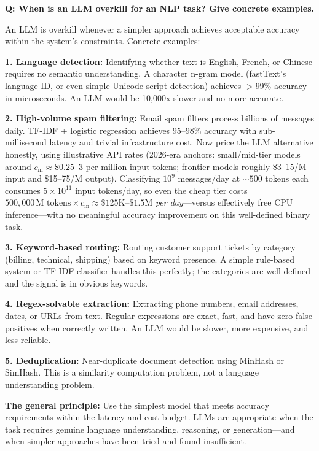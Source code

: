 \begin{interviewq}
\textbf{Q: When is an LLM overkill for an NLP task? Give concrete examples.}

 \quad {} \quad \badgefreq{\freqhigh}

\stronganswer
An LLM is overkill whenever a simpler approach achieves acceptable accuracy within the system's
constraints.  Concrete examples:

\textbf{1. Language detection:} Identifying whether text is English, French, or Chinese
requires no semantic understanding.  A character n-gram model (fastText's language ID, or
even simple Unicode script detection) achieves $>$99\% accuracy in microseconds.  An LLM
would be 10,000x slower and no more accurate.

\textbf{2. High-volume spam filtering:} Email spam filters process billions of messages daily.
TF-IDF + logistic regression achieves 95--98\% accuracy with sub-millisecond latency and
trivial infrastructure cost.  Now price the LLM alternative honestly, using illustrative
API rates (2026-era anchors: small/mid-tier models around $c_{\text{in}} \approx
\$0.25\text{--}3$ per million input tokens; frontier models roughly \$3--15/M input and
\$15--75/M output).  Classifying $10^9$ messages/day at ${\sim}500$ tokens each consumes
$5 \times 10^{11}$ input tokens/day, so even the cheap tier costs
$500{,}000\,\text{M tokens} \times c_{\text{in}} \approx \$125\text{K}\text{--}\$1.5\text{M}$
\emph{per day}---versus effectively free CPU inference---with no meaningful accuracy
improvement on this well-defined binary task.

\textbf{3. Keyword-based routing:} Routing customer support tickets by category (billing,
technical, shipping) based on keyword presence.  A simple rule-based system or TF-IDF
classifier handles this perfectly; the categories are well-defined and the signal is in
obvious keywords.

\textbf{4. Regex-solvable extraction:} Extracting phone numbers, email addresses, dates, or
URLs from text.  Regular expressions are exact, fast, and have zero false positives when
correctly written.  An LLM would be slower, more expensive, and less reliable.

\textbf{5. Deduplication:} Near-duplicate document detection using MinHash or SimHash.  This
is a similarity computation problem, not a language understanding problem.

\textbf{The general principle:} Use the simplest model that meets accuracy requirements within
the latency and cost budget.  LLMs are appropriate when the task requires genuine language
understanding, reasoning, or generation---and when simpler approaches have been tried and found
insufficient.


\end{interviewq}
